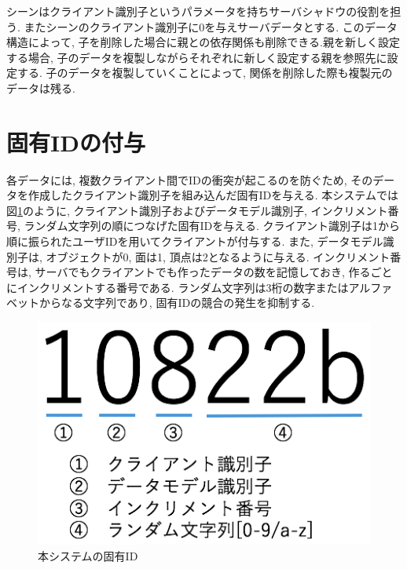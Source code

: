 シーンはクライアント識別子というパラメータを持ちサーバシャドウの役割を担う.
またシーンのクライアント識別子に0を与えサーバデータとする.
このデータ構造によって, 子を削除した場合に親との依存関係も削除できる.親を新しく設定する場合, 子のデータを複製しながらそれぞれに新しく設定する親を参照先に設定する.
子のデータを複製していくことによって, 関係を削除した際も複製元のデータは残る.
\section{固有IDの付与} \label{固有id}
各データには, 複数クライアント間でIDの衝突が起こるのを防ぐため, そのデータを作成したクライアント識別子を組み込んだ固有IDを与える.
本システムでは図\ref{uuid}のように, クライアント識別子およびデータモデル識別子, インクリメント番号, ランダム文字列の順につなげた固有IDを与える. クライアント識別子は1から順に振られたユーザIDを用いてクライアントが付与する. また, データモデル識別子は, オブジェクトが0, 面は1, 頂点は2となるように与える.
インクリメント番号は, サーバでもクライアントでも作ったデータの数を記憶しておき, 作るごとにインクリメントする番号である. ランダム文字列は3桁の数字またはアルファベットからなる文字列であり, 固有IDの競合の発生を抑制する.
\begin{figure}[]
  \begin{center}
    \includegraphics[scale=0.5]{images/uuid}
    \caption{本システムの固有ID}
    \label{uuid}
  \end{center}
\end{figure}

